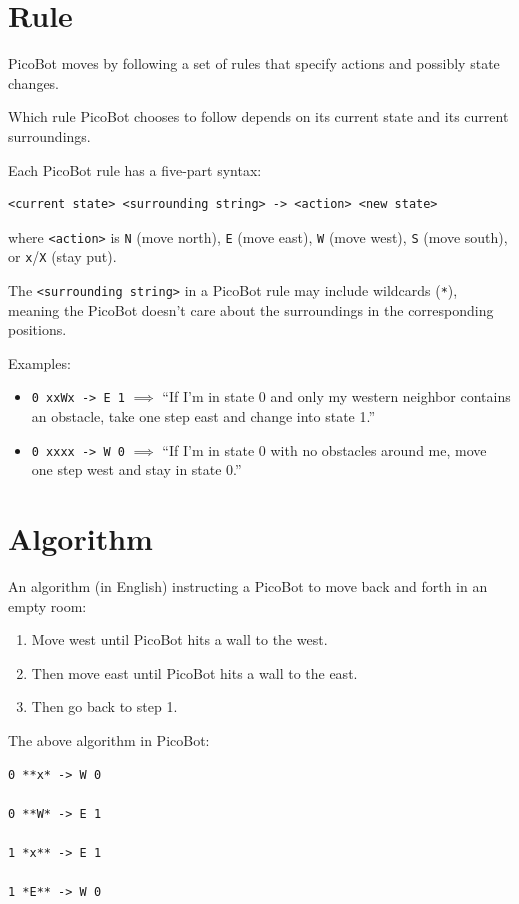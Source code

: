 \documentclass[8pt,a4paper,compress,handout]{beamer}
\begin{document}
\section{Rule}
\begin{frame}[fragile]
PicoBot moves by following a set of rules that specify actions and possibly state changes. 

\bigskip

Which rule PicoBot chooses to follow depends on its current state and its current surroundings.

\bigskip
Each PicoBot rule has a five-part syntax:
\begin{lstlisting}[language={}]
<current state> <surrounding string> -> <action> <new state>
\end{lstlisting}
where \lstinline{<action>} is \lstinline{N} (move north), \lstinline{E} (move east), \lstinline{W} (move west), \lstinline{S} (move south), or \lstinline{x}/\lstinline{X} (stay put).

\bigskip

The \lstinline{<surrounding string>} in a PicoBot rule may include wildcards (\lstinline{*}), meaning the PicoBot doesn't care about the surroundings in the corresponding positions.

\bigskip

Examples:
\begin{itemize}
\item \lstinline{0 xxWx -> E 1} $\implies$ ``If I'm in state 0 and only my western neighbor contains an obstacle, take one step east and change into state 1.''

\item \lstinline{0 xxxx -> W 0} $\implies$ ``If I'm in state 0 with no obstacles around me, move one step west and stay in state 0.''
\end{itemize}
\end{frame}

\section{Algorithm}
\begin{frame}[fragile]
An algorithm (in English) instructing a PicoBot to move back and forth in an empty room:
\begin{enumerate}
\item Move west until PicoBot hits a wall to the west.

\item Then move east until PicoBot hits a wall to the east.

\item Then go back to step 1.
\end{enumerate}

\bigskip

The above algorithm in PicoBot:
\begin{lstlisting}[language={}]
0 **x* -> W 0

0 **W* -> E 1

1 *x** -> E 1

1 *E** -> W 0
\end{lstlisting}
\end{frame}
\end{document}
